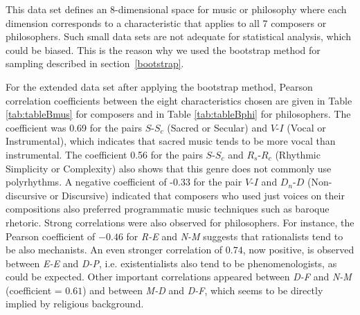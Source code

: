 \documentclass[
 aip,
 jmp,
 amsmath,amssymb,
 reprint,
]{revtex4-1}
\begin{document}
This data set defines an 8-dimensional space for music or philosophy
where each dimension corresponds to a characteristic that applies to
all 7 composers or philosophers. Such small data sets are not adequate
for statistical analysis, which could be biased. This is the reason
why we used the bootstrap method for sampling described in
section~\ref{bootstrap}.

For the extended data set after applying the bootstrap method, Pearson
correlation coefficients between the eight characteristics chosen are
given in Table \ref{tab:tableBmus} for composers and in Table
\ref{tab:tableBphi} for philosophers. The coefficient was 0.69 for the
pairs $S$-$S_c$ (Sacred or Secular) and $V$-$I$ (Vocal or
Instrumental), which indicates that sacred music tends to be more
vocal than instrumental. The coefficient 0.56 for the pairs $S$-$S_c$
and $R_s$-$R_c$ (Rhythmic Simplicity or Complexity) also shows that
this genre does not commonly use polyrhythms. A negative coefficient
of -0.33 for the pair $V$-$I$ and $D_n$-$D$ (Non-discursive or
Discursive) indicated that composers who used just voices on their
compositions also preferred programmatic music techniques such as
baroque rhetoric. Strong correlations were also observed for
philosophers. For instance, the Pearson coefficient of $-0.46$ for
\emph{R-E} and \emph{N-M} suggests that rationalists tend to be also
mechanists. An even stronger correlation of $0.74$, now positive, is
observed between \emph{E-E} and \emph{D-P}, i.e. existentialists also
tend to be phenomenologists, as could be expected. Other important
correlations appeared between \emph{D-F} and \emph{N-M} (coefficient =
$0.61$) and between \emph{M-D} and \emph{D-F}, which seems to be
directly implied by religious background.
\end{document}
